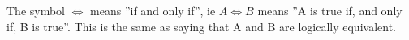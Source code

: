 The symbol $ \iff $ means ''if and only if'', ie $ A \iff B $
means ''A is true if, and only if, B is true''. This is the same as saying that A and B are logically equivalent.